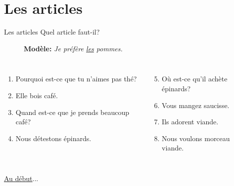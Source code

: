 \documentclass{beamer}
\begin{document}
  \section{Les articles}
    \begin{frame}{Les articles}
      Quel article faut-il?
      \begin{description}
        \item[] \textbf{Modèle:} \emph{Je préfère \underline{les} pommes.}
      \end{description}
      \begin{columns}
          \begin{enumerate}
            \item Pourquoi est-ce que tu n'aimes pas \underline{} thé?
            \item Elle bois \underline{} café.
            \item Quand est-ce que je prends beaucoup \underline{} café?
            \item Nous détestons \underline{} épinards.
          \end{enumerate}
          \begin{enumerate}
            \setcounter{enumi}{4}
            \item Où est-ce qu'il achète \underline{} épinards?
            \item Vous mangez \underline{} saucisse.
            \item Ils adorent \underline{} viande.
            \item Nous voulons \underline{} morceau \underline{} viande.
          \end{enumerate}
      \end{columns}
      \vspace{0.5cm}
      \hyperlink{début}{Au début}...
    \end{frame}
\end{document}

